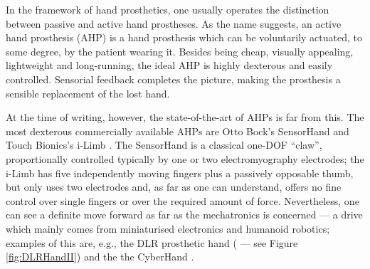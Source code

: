 In the framework of hand prosthetics, one usually operates the
distinction between passive and active hand prostheses. As the name
suggests, an active hand prosthesis (AHP) is a hand prosthesis which
can be voluntarily actuated, to some degree, by the patient wearing
it. Besides being cheap, visually appealing, lightweight and
long-running, the ideal AHP is highly dexterous and easily
controlled. Sensorial feedback completes the picture, making the
prosthesis a sensible replacement of the lost hand.

At the time of writing, however, the state-of-the-art of AHPs is far
from this. The most dexterous commercially available AHPs are Otto
Bock's SensorHand \cite{sensorhand} and Touch Bionics's i-Limb
\cite{ilimb}. The SensorHand is a classical one-DOF ``claw'',
proportionally controlled typically by one or two electromyography
electrodes; the i-Limb has five independently moving fingers plus a
passively opposable thumb, but only uses two electrodes and, as far as
one can understand, offers no fine control over single fingers or over
the required amount of force. Nevertheless, one can see a definite
move forward as far as the mechatronics is concerned --- a drive which
mainly comes from miniaturised electronics and humanoid robotics;
examples of this are, e.g., the DLR prosthetic hand (\cite{Hua2006}
--- see Figure \ref{fig:DLRHandII}) and the the CyberHand
\cite{cyberhand}.

